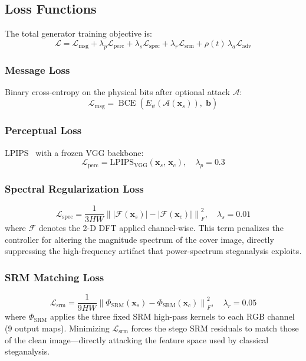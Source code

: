 \documentclass[journal]{IEEEtran}
\newcommand{\Lcal}{\mathcal{L}}
\DeclareMathOperator{\BCE}{BCE}
\newcommand{\FT}{\mathcal{F}}
\begin{document}
\subsection{Loss Functions}
\label{sec:losses}

The total generator training objective is:
\begin{equation}
    \Lcal = \Lcal_\text{msg} + \lambda_p\Lcal_\text{perc}
           + \lambda_s\Lcal_\text{spec}
           + \lambda_r\Lcal_\text{srm}
           + \rho(t)\,\lambda_a\Lcal_\text{adv}
    \label{eq:total_loss}
\end{equation}

\subsubsection{Message Loss}
Binary cross-entropy on the physical bits after optional attack $\mathcal{A}$:
\begin{equation}
    \Lcal_\text{msg} = \BCE\!\left(E_\psi(\mathcal{A}(\mathbf{x}_s)),\;\mathbf{b}\right)
    \label{eq:loss_msg}
\end{equation}

\subsubsection{Perceptual Loss}
LPIPS~\cite{zhang2018unreasonable} with a frozen VGG backbone:
\begin{equation}
    \Lcal_\text{perc} = \mathrm{LPIPS}_\text{VGG}(\mathbf{x}_s,\,\mathbf{x}_c),
    \quad \lambda_p = 0.3
    \label{eq:loss_perc}
\end{equation}

\subsubsection{Spectral Regularization Loss}
\begin{equation}
    \Lcal_\text{spec} = \frac{1}{3HW}\left\|
        |\FT(\mathbf{x}_s)| - |\FT(\mathbf{x}_c)|
    \right\|_F^2, \quad \lambda_s = 0.01
    \label{eq:loss_spec}
\end{equation}
where $\FT$ denotes the 2-D DFT applied channel-wise.
This term penalizes the controller for altering the magnitude spectrum of the cover image,
directly suppressing the high-frequency artifact that power-spectrum steganalysis exploits.

\subsubsection{SRM Matching Loss}
\begin{equation}
    \Lcal_\text{srm} = \frac{1}{9HW}\left\|
        \Phi_\text{SRM}(\mathbf{x}_s) - \Phi_\text{SRM}(\mathbf{x}_c)
    \right\|_F^2, \quad \lambda_r = 0.05
    \label{eq:loss_srm}
\end{equation}
where $\Phi_\text{SRM}$ applies the three fixed SRM high-pass kernels to each RGB channel
(9 output maps).
Minimizing $\Lcal_\text{srm}$ forces the stego SRM residuals to match those of the clean
image---directly attacking the feature space used by classical steganalysis.
\end{document}
